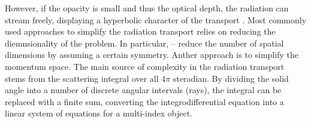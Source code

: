 However, if the opacity is small and thus the optical depth, the radiation can stream freely, 
displaying a hyperbolic character of the transport \citep{Mihalas:1984}. 
%
Most commonly used approaches to simplify the radiation transport relies on reducing the diemnsionality
of the problem. In particular, -- reduce the number of spatial dimensions by assuming a certain symmetry.
Anther approach is to simplify the momentum space. 
%
%
The main source of complexity in the radiation transport stems from the scattering 
integral over all 4$\pi$ steradian.
By dividing the solid angle into a number of discrete angular intervals (rays), the integral can be replaced with a
finite sum, converting the integrodifferential equation into a linear system of equations for a multi-index object. 
%
